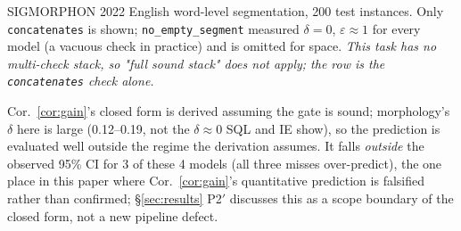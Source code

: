 \documentclass[11pt]{article}
\begin{document}
\begin{table}[t]
\begin{threeparttable}
\begin{tablenotes}[flushleft]
\item[h] SIGMORPHON 2022 English word-level segmentation, 200 test instances. Only \texttt{concatenates} is shown; \texttt{no\_empty\_segment} measured $\delta=0$, $\varepsilon\approx1$ for every model (a vacuous check in practice) and is omitted for space. \emph{This task has no multi-check stack, so "full sound stack" does not apply; the row is the \texttt{concatenates} check alone.}
\item[n] Cor.~\ref{cor:gain}'s closed form is derived assuming the gate is sound; morphology's $\delta$ here is large (0.12--0.19, not the $\delta\approx0$ SQL and IE show), so the prediction is evaluated well outside the regime the derivation assumes. It falls \emph{outside} the observed 95\% CI for 3 of these 4 models (all three misses over-predict), the one place in this paper where Cor.~\ref{cor:gain}'s quantitative prediction is falsified rather than confirmed; \S\ref{sec:results} P2$'$ discusses this as a scope boundary of the closed form, not a new pipeline defect.
\end{tablenotes}
\end{threeparttable}
\label{tab:params}
\end{table}
\end{document}
